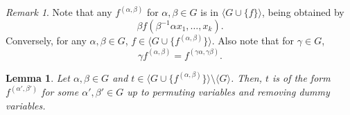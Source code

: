 \documentclass{article}
\newtheorem{lemma}[theorem]{Lemma}
\theoremstyle{remark}
\newtheorem{remark}[theorem]{Remark}
\theoremstyle{definition}
\begin{document}
\begin{remark}\label{rem:stuffinstuff} Note that any $f^{(\alpha, \beta)}$ for $\alpha, \beta\in G$ is in $\langle G\cup\{f\}\rangle$, being obtained by
\[\beta f(\beta^{-1}\alpha x_1, \dots, x_k).\] 
Conversely, for any $\alpha, \beta\in G$, $f\in \langle G\cup\{f^{(\alpha, \beta)}\}\rangle$. Also note that for $\gamma\in G$,
\[\gamma f^{(\alpha, \beta)}=f^{(\gamma\alpha, \gamma\beta)}.\]

\end{remark}

\begin{lemma}\label{lem:everythingpalfy} {Let $\alpha, \beta\in G$ and $t\in\langle G \cup \{f^{(\alpha, \beta)}\}\rangle \setminus \langle G\rangle$. Then, $t$ is of the form $f^{(\alpha', \beta')}$ for some $\alpha', \beta'\in G$ up to permuting variables and removing dummy variables.}
\end{lemma}
\end{document}
